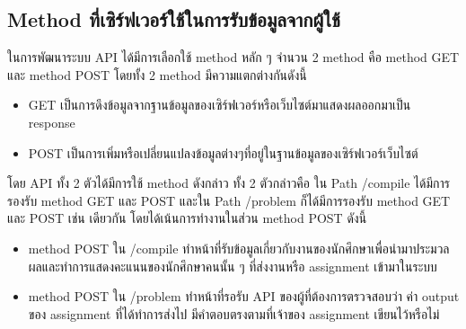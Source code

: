 \subsection{Method ที่เซิร์ฟเวอร์ใช้ในการรับข้อมูลจากผู้ใช้}
ในการพัฒนาระบบ API ได้มีการเลือกใช้ method หลัก ๆ จํานวน 2 method คือ
method GET และ method POST โดยทั้ง 2 method มีความแตกต่างกันดังนี้
\begin{itemize}
    \item GET เป็นการดึงข้อมูลจากฐานข้อมูลของเซิร์ฟเวอร์หรือเว็บไซต์มาแสดงผลออกมาเป็น response
    \item POST เป็นการเพิ่มหรือเปลี่ยนแปลงข้อมูลต่างๆที่อยู่ในฐานข้อมูลของเซิร์ฟเวอร์เว็บไซต์
\end{itemize}
โดย API ทั้ง 2 ตัวได้มีการใช้ method ดังกล่าว ทั้ง 2 ตัวกล่าวคือ ใน Path /compile ได้มีการรองรับ
method GET และ POST และใน Path /problem ก็ได้มีการรองรับ method GET และ POST เช่น
เดียวกัน โดยได้เน้นการทํางานในส่วน method POST ดังนี้
\begin{itemize}
    \item method POST ใน /compile ทําหน้าที่รับข้อมูลเกี่ยวกับงานของนักศึกษาเพื่อนํามาประมวล
ผลและทําการแสดงคะแนนของนักศึกษาคนนั้น ๆ ที่ส่งงานหรือ assignment เข้ามาในระบบ
    \item method POST ใน /problem ทําหน้าที่รอรับ API ของผู้ที่ต้องการตรวจสอบว่า ค่า output
ของ assignment ที่ได้ทําการส่งไป มีคําตอบตรงตามที่เจ้าของ assignment เขียนไว้หรือไม่
\end{itemize}